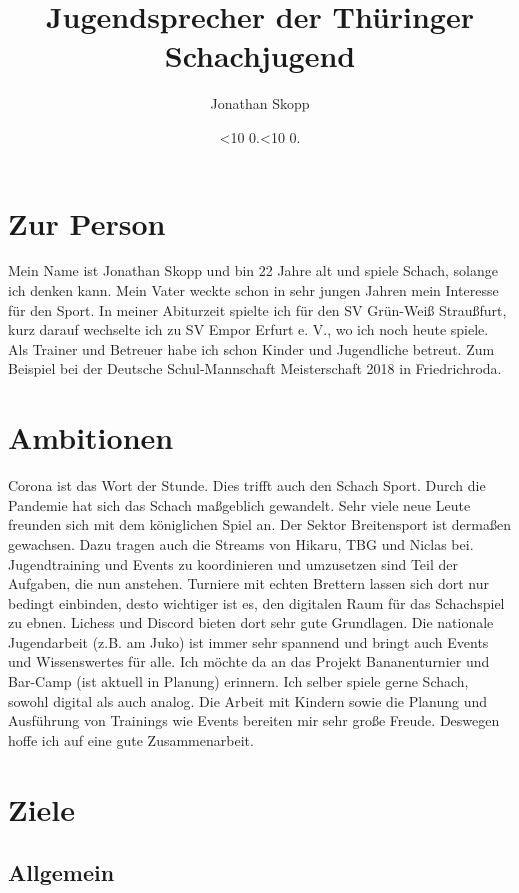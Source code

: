 \documentclass[letterpaper,12pt]{article}
\newcommand{\leadingzero}[1]{\ifnum #1<10 0\the#1\else\the#1\fi}
\renewcommand{\today}{\leadingzero{\day}.\leadingzero{\month}.\the\year}     %
\begin{document}
\title{Jugendsprecher der Thüringer Schachjugend}
\author{Jonathan Skopp}
\date{\today}
\maketitle

\section{Zur Person}
Mein Name ist Jonathan Skopp und bin 22 Jahre alt und spiele Schach, solange ich denken kann. Mein Vater weckte schon in sehr jungen Jahren mein Interesse für den Sport. In meiner Abiturzeit spielte ich für den SV Grün-Weiß Straußfurt, kurz darauf wechselte ich zu SV Empor Erfurt e. V., wo ich noch heute spiele. Als Trainer und Betreuer habe ich schon Kinder und Jugendliche betreut. Zum Beispiel bei der Deutsche Schul-Mannschaft Meisterschaft 2018 in Friedrichroda.


\section{Ambitionen}

Corona ist das Wort der Stunde. Dies trifft auch den Schach Sport. Durch die Pandemie hat sich das Schach maßgeblich gewandelt. Sehr viele neue Leute freunden sich mit dem königlichen Spiel an. Der Sektor Breitensport ist dermaßen gewachsen. Dazu tragen auch die Streams von Hikaru, TBG und Niclas bei. Jugendtraining und Events zu koordinieren und umzusetzen sind Teil der Aufgaben, die nun anstehen. Turniere mit echten Brettern lassen sich dort nur bedingt einbinden, desto wichtiger ist es, den digitalen Raum für das Schachspiel zu ebnen.
Lichess und Discord bieten dort sehr gute Grundlagen. Die nationale Jugendarbeit (z.B. am Juko) ist immer sehr spannend und bringt auch Events und Wissenswertes für alle. Ich möchte da an das Projekt Bananenturnier und Bar-Camp (ist aktuell in Planung) erinnern. Ich selber spiele gerne Schach, sowohl digital als auch analog. Die Arbeit mit Kindern sowie die Planung und Ausführung von Trainings wie Events bereiten mir sehr große Freude. Deswegen hoffe ich auf eine gute Zusammenarbeit.


\section{Ziele}

\subsection{Allgemein}
\end{document}
